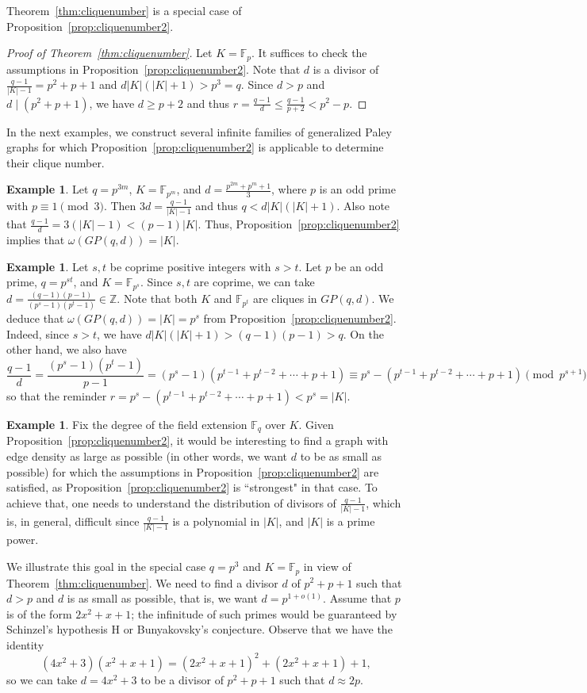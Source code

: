 \documentclass[12pt,reqno]{amsart}
\theoremstyle{definition}
\newtheorem{ex}[thm]{Example}
\newcommand{\Z}{\mathbb{Z}}
\newcommand{\F}{\mathbb{F}}
\begin{document}
Theorem~\ref{thm:cliquenumber} is a special case of Proposition~\ref{prop:cliquenumber2}.

\begin{proof}[Proof of Theorem~\ref{thm:cliquenumber}]
Let $K=\F_p$. It suffices to check the assumptions in Proposition~\ref{prop:cliquenumber2}. Note that $d$ is a divisor of $\frac{q-1}{|K|-1}=p^2+p+1$ and $d|K|(|K|+1)>p^3=q$. Since $d>p$ and $d \mid (p^2+p+1)$, we have $d \geq p+2$ and thus $r=\frac{q-1}{d} \leq \frac{q-1}{p+2}<p^2-p$. 
\end{proof}

In the next examples, we construct several infinite families of generalized Paley graphs for which Proposition~\ref{prop:cliquenumber2} is applicable to determine their clique number. 
\begin{ex}
Let $q=p^{3m}$, $K=\F_{p^m}$, and $d=\frac{p^{2m}+p^m+1}{3}$, where $p$ is an odd prime with $p \equiv 1 \pmod 3$. Then $3d=\frac{q-1}{|K|-1}$ and thus $q<d|K|(|K|+1)$. Also note that $\frac{q-1}{d}=3(|K|-1)<(p-1)|K|$. Thus, Proposition~\ref{prop:cliquenumber2} implies that $\omega(GP(q,d))=|K|$.
\end{ex}

\begin{ex}
Let $s,t$ be coprime positive integers with $s>t$. Let $p$ be an odd prime, $q=p^{st}$, and $K=\F_{p^s}$. Since $s,t$ are coprime, we can take $d=\frac{(q-1)(p-1)}{(p^s-1)(p^t-1)} \in \Z$. Note that both $K$ and $\F_{p^t}$ are cliques in $GP(q,d)$. We deduce that $\omega(GP(q,d))=|K|=p^s$ from Proposition~\ref{prop:cliquenumber2}. Indeed, since $s>t$, we have $d|K|(|K|+1)>(q-1)(p-1)>q$. On the other hand, we also have
$$
\frac{q-1}{d}=\frac{(p^s-1)(p^t-1)}{p-1}=(p^s-1)(p^{t-1}+p^{t-2}+\cdots+p+1) \equiv p^s-(p^{t-1}+p^{t-2}+\cdots+p+1) \pmod {p^{s+1}}
$$
so that the reminder $r=p^s-(p^{t-1}+p^{t-2}+\cdots+p+1)<p^s=|K|$.
\end{ex}

\begin{ex}
Fix the degree of the field extension $\F_q$ over $K$. Given Proposition~\ref{prop:cliquenumber2}, it would be interesting to find a graph with edge density as large as possible (in other words, we want $d$ to be as small as possible) for which the assumptions in Proposition~\ref{prop:cliquenumber2} are satisfied, as Proposition~\ref{prop:cliquenumber2} is ``strongest" in that case. To achieve that, one needs to understand the distribution of divisors of $\frac{q-1}{|K|-1}$, which is, in general, difficult since $\frac{q-1}{|K|-1}$ is a polynomial in $|K|$, and $|K|$ is a prime power. 

We illustrate this goal in the special case $q=p^3$ and $K=\F_p$ in view of Theorem~\ref{thm:cliquenumber}. We need to find a divisor $d$ of $p^2+p+1$ such that $d>p$ and $d$ is as small as possible, that is, we want $d=p^{1+o(1)}$. Assume that $p$ is of the form $2x^2+x+1$; the infinitude of such primes would be guaranteed by Schinzel's hypothesis H \cite{SS58} or Bunyakovsky's conjecture. Observe that we have the identity
$$
(4x^2+3)(x^2+x+1)=(2x^2+x+1)^2+(2x^2+x+1)+1,
$$
so we can take $d=4x^2+3$ to be a divisor of $p^2+p+1$ such that $d \approx 2p$. 
\end{ex}
\end{document}
